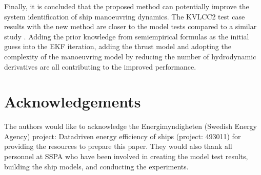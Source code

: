 \documentclass[review]{elsarticle}
\begin{document}
\sphinxAtStartPar
Finally, it is concluded that the proposed method can potentially improve the system identification of ship manoeuvring dynamics. The KVLCC2 test case results with the new method are closer to the model tests compared to a similar study \cite{he_nonparametric_2022}. Adding the prior knowledge from semi\sphinxhyphen{}empirical formulas as the initial guess into the EKF iteration, adding the thrust model and adopting the complexity of the manoeuvring model by reducing the number of hydrodynamic derivatives are all contributing to the improved performance.


\section{Acknowledgements}
\label{\detokenize{acknowledgements:acknowledgements}}\label{\detokenize{acknowledgements::doc}}
\sphinxAtStartPar
The authors would like to acknowledge the Energimyndigheten (Swedish Energy Agency) project: Data\sphinxhyphen{}driven energy efficiency of ships (project: 49301\sphinxhyphen{}1) for providing the resources to prepare this paper. They would also thank all personnel at SSPA who have been involved in creating the model test results, building the ship models, and conducting the experiments.
\label{\detokenize{bibligraphy:id1}}







\renewcommand{\indexname}{Index}


\end{document}

